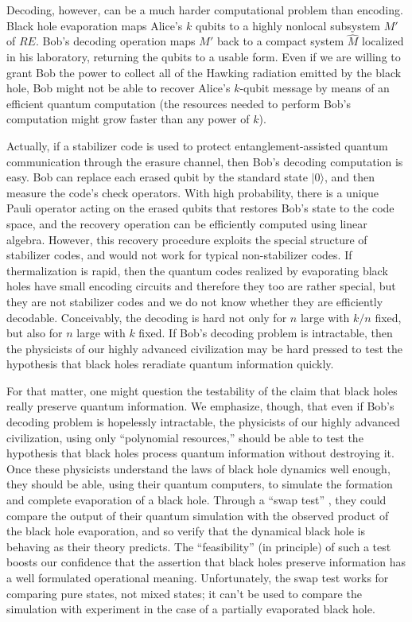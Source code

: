 \documentclass[11pt]{article}
\begin{document}
Decoding, however, can be a much harder computational problem than encoding. Black hole evaporation maps Alice's $k$ qubits to a highly nonlocal subsystem $M'$ of $RE$. Bob's decoding operation maps $M'$ back to a compact system $\hat M$ localized in his laboratory, returning the qubits to a usable form. Even if we are willing to grant Bob the power to collect all of the Hawking radiation emitted by the black hole, Bob might not be able to recover Alice's $k$-qubit message by means of an efficient quantum computation (the resources needed to perform Bob's computation might grow faster than any power of $k$). 

Actually, if a stabilizer code is used to protect entanglement-assisted quantum communication through the erasure channel, then Bob's decoding computation is easy. Bob can replace each erased qubit by the standard state $|0\rangle$, and then measure the code's check operators. With high probability, there is a unique Pauli operator acting on the erased qubits that restores Bob's state to the code space, and the recovery operation can be efficiently computed using linear algebra. However, this recovery procedure exploits the special structure of stabilizer codes, and would not work for typical non-stabilizer codes. If thermalization is rapid, then the quantum codes realized by evaporating black holes have small encoding circuits and therefore they too are rather special, but they are not stabilizer codes and we do not know whether they are efficiently decodable. Conceivably, the decoding is hard not only for $n$ large with $k/n$ fixed, but also for $n$ large with $k$ fixed. If Bob's decoding problem is intractable, then the physicists of our highly advanced civilization may be hard pressed to test the hypothesis that black holes reradiate quantum information quickly. 

For that matter, one might question the testability of the claim that black holes really preserve quantum information. We emphasize, though, that even if Bob's decoding problem is hopelessly intractable, the physicists of our highly advanced civilization, using only ``polynomial resources,'' should be able to test the hypothesis that black holes process quantum information without destroying it. Once these physicists understand the laws of black hole dynamics well enough, they should be able, using their quantum computers, to simulate the formation and complete evaporation of a black hole. Through a ``swap test'' \cite{swap}, they could compare the output of their quantum simulation with the observed product of the black hole evaporation, and so verify that the dynamical black hole is behaving as their theory predicts. The ``feasibility'' (in principle) of such a test boosts our confidence that the assertion that black holes preserve information has a well formulated operational meaning. Unfortunately, the swap test works for comparing pure states, not mixed states; it can't be used to compare the simulation with experiment in the case of a partially evaporated black hole. 
\end{document}
